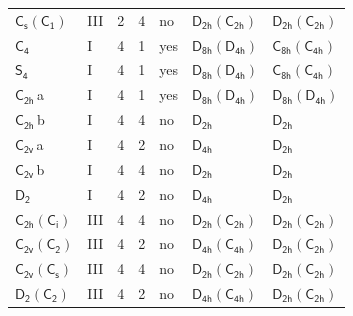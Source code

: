 \documentclass[10pt,a4paper]{article}
\numberwithin{equation}{section}
\newcommand{\grp}[1]{\mathsf{#1}}
\newcommand{\clsletter}[1]{\,{\scriptsize\color{black!55}#1}}
\begin{document}
{\begin{longtable}{@{}llrrlll@{}}
\href{C1v-C1.pdf}{$\grp{C_{s}}(\grp{C_{1}})$} & III & 2 & 4 & no & \href{D2h-C2h.pdf}{$\grp{D_{2h}}(\grp{C_{2h}})$} & \href{D2h-C2h.pdf}{$\grp{D_{2h}}(\grp{C_{2h}})$}\\
\href{../../../rotation/data/pdf/C4.pdf}{$\grp{C_{4}}$} & I & 4 & 1 & yes & \href{D8h-D4h.pdf}{$\grp{D_{8h}}(\grp{D_{4h}})$} & \href{C8h-C4h.pdf}{$\grp{C_{8h}}(\grp{C_{4h}})$}\\
\href{../../../rotation/data/pdf/S4.pdf}{$\grp{S_{4}}$} & I & 4 & 1 & yes & \href{D8h-D4h.pdf}{$\grp{D_{8h}}(\grp{D_{4h}})$} & \href{C8h-C4h.pdf}{$\grp{C_{8h}}(\grp{C_{4h}})$}\\
\href{../../../rotation/data/pdf/C2h.pdf}{$\grp{C_{2h}}$}\clsletter{a} & I & 4 & 1 & yes & \href{D8h-D4h.pdf}{$\grp{D_{8h}}(\grp{D_{4h}})$} & \href{D8h-D4h.pdf}{$\grp{D_{8h}}(\grp{D_{4h}})$}\\
\href{../../../rotation/data/pdf/C2h.pdf}{$\grp{C_{2h}}$}\clsletter{b} & I & 4 & 4 & no & \href{../../../rotation/data/pdf/D2h.pdf}{$\grp{D_{2h}}$} & \href{../../../rotation/data/pdf/D2h.pdf}{$\grp{D_{2h}}$}\\
\href{../../../rotation/data/pdf/C2v.pdf}{$\grp{C_{2v}}$}\clsletter{a} & I & 4 & 2 & no & \href{../../../rotation/data/pdf/D4h.pdf}{$\grp{D_{4h}}$} & \href{../../../rotation/data/pdf/D2h.pdf}{$\grp{D_{2h}}$}\\
\href{../../../rotation/data/pdf/C2v.pdf}{$\grp{C_{2v}}$}\clsletter{b} & I & 4 & 4 & no & \href{../../../rotation/data/pdf/D2h.pdf}{$\grp{D_{2h}}$} & \href{../../../rotation/data/pdf/D2h.pdf}{$\grp{D_{2h}}$}\\
\href{../../../rotation/data/pdf/D2.pdf}{$\grp{D_{2}}$} & I & 4 & 2 & no & \href{../../../rotation/data/pdf/D4h.pdf}{$\grp{D_{4h}}$} & \href{../../../rotation/data/pdf/D2h.pdf}{$\grp{D_{2h}}$}\\
\href{C2h-S2.pdf}{$\grp{C_{2h}}(\grp{C_{i}})$} & III & 4 & 4 & no & \href{D2h-C2h.pdf}{$\grp{D_{2h}}(\grp{C_{2h}})$} & \href{D2h-C2h.pdf}{$\grp{D_{2h}}(\grp{C_{2h}})$}\\
\href{C2v-C2.pdf}{$\grp{C_{2v}}(\grp{C_{2}})$} & III & 4 & 2 & no & \href{D4h-C4h.pdf}{$\grp{D_{4h}}(\grp{C_{4h}})$} & \href{D2h-C2h.pdf}{$\grp{D_{2h}}(\grp{C_{2h}})$}\\
\href{C2v-C1v.pdf}{$\grp{C_{2v}}(\grp{C_{s}})$} & III & 4 & 4 & no & \href{D2h-C2h.pdf}{$\grp{D_{2h}}(\grp{C_{2h}})$} & \href{D2h-C2h.pdf}{$\grp{D_{2h}}(\grp{C_{2h}})$}\\
\href{D2-C2.pdf}{$\grp{D_{2}}(\grp{C_{2}})$} & III & 4 & 2 & no & \href{D4h-C4h.pdf}{$\grp{D_{4h}}(\grp{C_{4h}})$} & \href{D2h-C2h.pdf}{$\grp{D_{2h}}(\grp{C_{2h}})$}\\

\end{longtable}}
\end{document}

